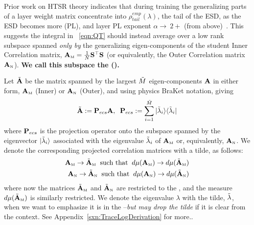 Prior work on HTSR theory indicates that during training the generalizing parts of a layer weight matrix concentrate
into $\rho_{tail}^{emp}(\lambda)$, the tail of the ESD, as the ESD becomes more \PowerLaw (PL),
and layer PL exponent  $\alpha\rightarrow\ 2+$ (from above)~\cite{MM19_HTSR_ICML,MM20_SDM,MM18_TR_JMLRversion,MM20a_trends_NatComm,YTHx23_KDD}. 
This suggests the integral in \EQN~\ref{eqn:QT}
should instead average over a low rank subspace spanned \emph{only by} the generalizing eigen-components of the
student Inner Correlation matrix, ${\mathbf{A}}_{\text{\tiny M}}=\tfrac{1}{N}{\mathbf{S}}^{\top}{\mathbf{S}}$
(or equivalently, the Outer Correlation matrix ${\mathbf{A}}_{\text{\tiny N}}$).
\textbf{We call this subspace the \EffectiveCorrelationSpace (\ECS).}

Let $\tilde{\mathbf{A}}$ be the matrix spanned by the largest $\tilde{M}$ eigen-components $\mathbf{A}$
in either form, ${\mathbf{A}}_{\text{\tiny M}}$ (Inner) or ${\mathbf{A}}_{\text{\tiny N}}$ (Outer), and using physics BraKet notation, giving
\begin{align}
  \label{sqn:AecsDefined}
  \tilde{\mathbf{A}}:=\mathbf{P}_{ecs}\mathbf{A},\;\;  \mathbf{P}_{ecs}:= \sum_{i=1}^{\tilde{M}}|\tilde{\lambda}_{i}\rangle\langle\tilde{\lambda}_{i}|
\end{align}
where $\mathbf{P}_{ecs}$ is the projection operator onto the subspace spanned by the eigenvector
$|\tilde{\lambda}_{i}\rangle$  associated with the eigenvalue $\tilde{\lambda}_{i}$ of ${\mathbf{A}}_{\text{\tiny M}}$ or, equivalently, ${\mathbf{A}}_{\text{\tiny N}}$.
We denote the corresponding projected \Student correlation matrices with a tilde, as follows:
\begin{align}
  {\mathbf{A}}_{\text{\tiny M}} \rightarrow \tilde{\mathbf{A}}_{\text{\tiny M}}\;\; \text{such that}\;\; d\mu({\mathbf{A}}_{\text{\tiny M}}) \rightarrow d\mu(\tilde{\mathbf{A}}_{\text{\tiny M}}) \\ \nonumber
  {\mathbf{A}}_{\text{\tiny N}} \rightarrow \tilde{\mathbf{A}}_{\text{\tiny N}}\;\; \text{such that}\;\; d\mu({\mathbf{A}}_{\text{\tiny N}}) \rightarrow d\mu(\tilde{\mathbf{A}}_{\text{\tiny N}})  \nonumber
\end{align}
where now the matrices $\tilde{\mathbf{A}}_{\text{\tiny M}}$ and $\tilde{\mathbf{A}}_{\text{\tiny N}}$ are restricted to the \ECS, and the measure $d\mu(\tilde{\mathbf{A}}_{\text{\tiny M}})$ is similarly restricted.  We denote the eigenvalue $\lambda$ with the tilde, $\tilde{\lambda}$, when we want to emphasize it is in the \ECS--\emph{but may drop the tilde} if it is clear from the context.
 See Appendix~\ref{sxn:TraceLogDerivation} for more..
   
